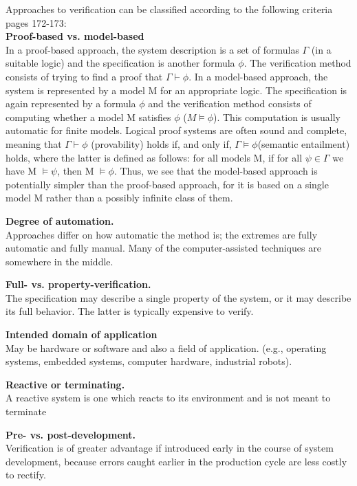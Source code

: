 Approaches to verification can be classified according to the following criteria \cite{HuthR1} pages 172-173:\\
\textbf{Proof-based vs. model-based}\\
In a proof-based approach, the system description 
is a set of formulas $\Gamma$ (in a suitable logic) and the specification is another formula $\phi$. 
The verification method consists of trying to find a proof that $\Gamma \vdash \phi$. 
In a model-based approach, the system is represented by a model M for an appropriate logic.
The specification is again represented by a formula $\phi$ and the verification method consists 
of computing whether a model M satisfies $\phi$ ($M \models \phi$). This computation is usually automatic
for finite models. Logical proof systems are often sound and complete, meaning that $\Gamma \vdash \phi$ (provability) holds if, and only
if, $\Gamma\models\phi$(semantic entailment) holds, where the latter is defined 
as follows: 
for all models M, if for all $\psi \in \Gamma$ we have M $\models\psi$, then M $\models\phi$.
Thus, we see that the model-based approach is potentially simpler than
the proof-based approach, for it is based on a single model M rather
than a possibly infinite class of them.

\textbf{Degree of automation. }\\ 
Approaches differ on how automatic the method is; 
the extremes are fully automatic and fully manual. Many
of the computer-assisted techniques are somewhere in the middle.

\textbf{Full- vs. property-verification.}\\ 
The specification may describe a single property of the system, or it may describe its full behavior. 
The latter is typically expensive to verify.

\textbf{Intended domain of application}\\  May be hardware or software and also a field of application.
(e.g., operating systems, embedded systems, computer hardware, industrial robots).

\textbf{Reactive or terminating.}\\ A reactive system
is one which reacts to its environment and is not meant to terminate

\textbf{Pre- vs. post-development. }\\ 
Verification is of greater advantage if introduced early in the course of system development, because errors
caught earlier in the production cycle are less costly to rectify.


